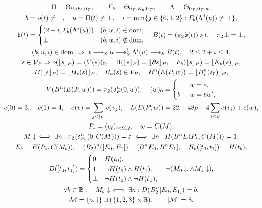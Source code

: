 \begin{gather}
\Pi=\Theta_{\partial,\partial_Y,0_\T},\qquad
F_b=\Theta_{0_\T,K_b,0_\T},\qquad \Lambda=\Theta_{0_\T,0_\T,\kappa},\\
b=o(t)\ne\bot,\quad u=\Pi(t)\ne\bot,\quad
i=\min\{j\in\{0,1,2\}:F_b(\Lambda^j(u))\ne\bot\},\\
\mathfrak b(t)=\begin{cases}(2+i,F_b(\Lambda^i(u)))&(b,u,i)\in{\rm dom},\\ \bot&(b,u,i)\notin{\rm dom},\end{cases}\quad
B(t)=(\pi_2\mathfrak b(t))\triangleright t,\quad \pi_2\bot=\bot,\\
(b,u,i)\in{\rm dom}\ \Rightarrow\ t\R u\R^i \Lambda^i(u)\R B(t),\quad 2\le 2+i\le4,\\
s\in{\cal V}_P\Rightarrow
o(\lfloor s\rfloor_P)=(V(s))_0,\quad
\Pi(\lfloor s\rfloor_P)=\lfloor\partial s\rfloor_P,\quad
F_b(\lfloor s\rfloor_P)=\lfloor K_b(s)\rfloor_P,\\
B(\lfloor s\rfloor_P)=\lfloor B_*(s)\rfloor_P,\quad
B_*(s)\in{\cal V}_P,\quad
B^n(E(P,w))=\lfloor B_*^n(s_0)\rfloor_P,\\
V(B^n(E(P,w)))=\pi_2(\delta_P^n(0,w)),\quad (w)_0=
\begin{cases}\bot&w=\varepsilon,\\ b&w=bw',\end{cases}\\
c(0)=3,\quad c(1)=4,\quad c(v)=\sum_{j<|v|}c(v_j),\quad
L(E(P,w))=22+48p+4\sum_{i<p}c(v_i)+c(w),\\
\begin{gathered}
P_*=(v_i)_{i<912},\quad w=C(M),\\
M\downarrow\iff\exists n:\pi_2(\delta_{P_*}^n(0,C(M)))=\varepsilon
\iff\exists n:H(B^n E(P_*,C(M)))=1,
\end{gathered}\\
E_b=E(P_*,C(M_b)),\quad (B_2)^n([E_0,E_1])=[B^nE_0,B^nE_1],
\quad H_b([t_0,t_1])=H(t_b),\\
D([t_0,t_1])=\begin{cases}0&H(t_0),\\1&\neg H(t_0)\land H(t_1),\\
\bot&\neg H(t_0)\land\neg H(t_1),\end{cases}\quad
\neg(M_0\downarrow\land M_1\downarrow),\\
\forall b\in\mathbb B:\quad
M_b\downarrow\iff\exists n:D(B_2^n[E_0,E_1])=b .\\
\mathcal M=\{\diamond,\dagger\}\sqcup(\{1,2,3\}\times\mathbb B),\qquad |\mathcal M|=8,\\

\end{gather}
